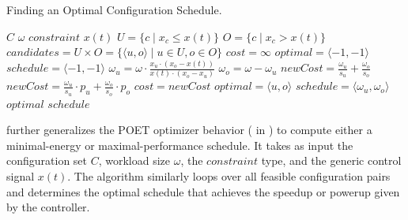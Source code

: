 \begin{algorithm}[t]
  \caption{Finding an Optimal Configuration Schedule.}
  \begin{algorithmic}
    \footnotesize
    \Require $C$ 
    \Require $\omega$ 
    \Require $constraint$ 
    \Require $x(t)$ 
    \State $U = \{c \mid x_c \le x(t) \}$
    \State $O = \{c \mid x_c > x(t)\}$
    \State $candidates = U \times O = \{\langle u,o \rangle \mid u \in U, o \in O\}$
    \State $cost = \infty$
    \State $optimal = \langle -1,-1 \rangle$
    \State $schedule = \langle -1,-1 \rangle$ \newline
     
    \State $\omega_u = \omega \cdot \frac{x_u \cdot (x_o - x(t))}{x(t) \cdot (x_o - x_u)}$ 
    \State $\omega_o = \omega - \omega_u$
     
    \State $newCost = \frac{\omega_u}{s_u} + \frac{\omega_o}{s_o}$ 
    \Else
    \State $newCost = \frac{\omega_u}{s_u} \cdot p_u + \frac{\omega_o}{s_o} \cdot p_o$ 
    \EndIf
     
    \State $cost = newCost$
    \State $optimal = \langle u,o \rangle$
    \State $schedule = \langle \omega_u,\omega_o \rangle$
    \EndIf
    \EndFor \newline \newline
    \Return $optimal$  \newline
    \Return $schedule$ 
  \end{algorithmic}
  \label{algo:bard-optimal}
\end{algorithm}

 further generalizes the POET optimizer behavior ( in ) to compute either a minimal-energy or maximal-performance schedule.
It takes as input the configuration set $C$, workload size $\omega$, the $constraint$ type, and the generic control signal $x(t)$.
The algorithm similarly loops over all feasible configuration pairs and determines the optimal schedule that achieves the speedup or powerup given by the controller.

